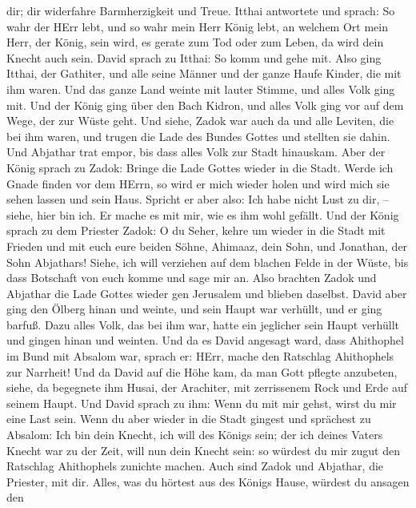 dir; dir widerfahre Barmherzigkeit und Treue.  Itthai
antwortete und sprach: So wahr der HErr lebt, und so wahr mein Herr
König lebt, an welchem Ort mein Herr, der König, sein wird, es gerate
zum Tod oder zum Leben, da wird dein Knecht auch sein. 
David sprach zu Itthai: So komm und gehe mit. Also ging Itthai, der
Gathiter, und alle seine Männer und der ganze Haufe Kinder, die mit ihm
waren.  Und das ganze Land weinte mit lauter Stimme, und
alles Volk ging mit. Und der König ging über den Bach Kidron, und alles
Volk ging vor auf dem Wege, der zur Wüste geht.  Und siehe,
Zadok war auch da und alle Leviten, die bei ihm waren, und trugen die
Lade des Bundes Gottes und stellten sie dahin. Und Abjathar trat empor,
bis dass alles Volk zur Stadt hinauskam.  Aber der König
sprach zu Zadok: Bringe die Lade Gottes wieder in die Stadt. Werde ich
Gnade finden vor dem HErrn, so wird er mich wieder holen und wird mich
sie sehen lassen und sein Haus.  Spricht er aber also: Ich
habe nicht Lust zu dir, -- siehe, hier bin ich. Er mache es mit mir, wie
es ihm wohl gefällt.  Und der König sprach zu dem Priester
Zadok: O du Seher, kehre um wieder in die Stadt mit Frieden und mit euch
eure beiden Söhne, Ahimaaz, dein Sohn, und Jonathan, der Sohn Abjathars!
 Siehe, ich will verziehen auf dem blachen Felde in der
Wüste, bis dass Botschaft von euch komme und sage mir an. 
Also brachten Zadok und Abjathar die Lade Gottes wieder gen Jerusalem
und blieben daselbst.  David aber ging den Ölberg hinan und
weinte, und sein Haupt war verhüllt, und er ging barfuß. Dazu alles
Volk, das bei ihm war, hatte ein jeglicher sein Haupt verhüllt und
gingen hinan und weinten.  Und da es David angesagt ward,
dass Ahithophel im Bund mit Absalom war, sprach er: HErr, mache den
Ratschlag Ahithophels zur Narrheit!  Und da David auf die
Höhe kam, da man Gott pflegte anzubeten, siehe, da begegnete ihm Husai,
der Arachiter, mit zerrissenem Rock und Erde auf seinem Haupt.
 Und David sprach zu ihm: Wenn du mit mir gehst, wirst du
mir eine Last sein.  Wenn du aber wieder in die Stadt
gingest und sprächest zu Absalom: Ich bin dein Knecht, ich will des
Königs sein; der ich deines Vaters Knecht war zu der Zeit, will nun dein
Knecht sein: so würdest du mir zugut den Ratschlag Ahithophels zunichte
machen.  Auch sind Zadok und Abjathar, die Priester, mit
dir. Alles, was du hörtest aus des Königs Hause, würdest du ansagen den
